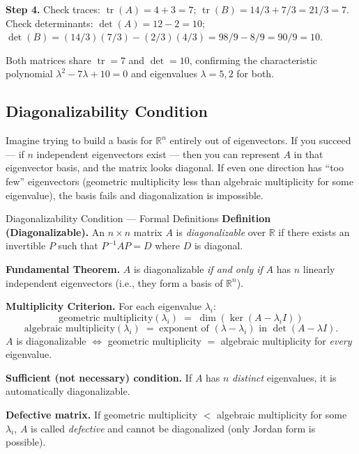 \documentclass[12pt,a4paper]{article}
\begin{document}
\textbf{Step 4.} Check traces: $\operatorname{tr}(A) = 4+3 = 7$; $\operatorname{tr}(B) = 14/3+7/3 = 21/3 = 7$. \checkmark \\
Check determinants: $\det(A) = 12-2 = 10$; $\det(B) = (14/3)(7/3)-(2/3)(4/3) = 98/9-8/9 = 90/9 = 10$. \checkmark

Both matrices share $\operatorname{tr}=7$ and $\det=10$, confirming the characteristic polynomial $\lambda^2 - 7\lambda + 10 = 0$ and eigenvalues $\lambda = 5, 2$ for both.


\subsection{Diagonalizability Condition}

Imagine trying to build a basis for $\mathbb{R}^n$ entirely out of eigenvectors.
If you succeed --- if $n$ independent eigenvectors exist --- then you can represent $A$ in that eigenvector basis, and the matrix looks diagonal.
If even one direction has ``too few'' eigenvectors (geometric multiplicity less than algebraic multiplicity for some eigenvalue), the basis fails and diagonalization is impossible.

\begin{infobox}{Diagonalizability Condition --- Formal Definitions}
\textbf{Definition (Diagonalizable).}
An $n\times n$ matrix $A$ is \emph{diagonalizable} over $\mathbb{R}$ if there exists an invertible $P$ such that $P^{-1}AP = D$ where $D$ is diagonal.

\textbf{Fundamental Theorem.}
$A$ is diagonalizable \emph{if and only if} $A$ has $n$ linearly independent eigenvectors (i.e., they form a basis of $\mathbb{R}^n$).

\textbf{Multiplicity Criterion.}
For each eigenvalue $\lambda_i$:
\[
  \text{geometric multiplicity}(\lambda_i) \;=\; \dim(\ker(A - \lambda_i I))
\]
\[
  \text{algebraic multiplicity}(\lambda_i) \;=\; \text{exponent of } (\lambda - \lambda_i) \text{ in } \det(A-\lambda I).
\]
$A$ is diagonalizable $\Longleftrightarrow$ geometric multiplicity $=$ algebraic multiplicity for \emph{every} eigenvalue.

\textbf{Sufficient (not necessary) condition.}
If $A$ has $n$ \emph{distinct} eigenvalues, it is automatically diagonalizable.

\textbf{Defective matrix.}
If geometric multiplicity $<$ algebraic multiplicity for some $\lambda_i$, $A$ is called \emph{defective} and cannot be diagonalized (only Jordan form is possible).
\end{infobox}
\end{document}
